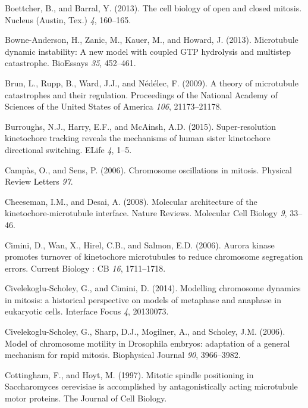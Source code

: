 \documentclass[12pt,a4paper,twoside,openright]{book}
\begin{document}
Boettcher, B., and Barral, Y. (2013). The cell biology of open and
closed mitosis. Nucleus (Austin, Tex.) \emph{4}, 160--165.

Bowne-Anderson, H., Zanic, M., Kauer, M., and Howard, J. (2013).
Microtubule dynamic instability: A new model with coupled GTP hydrolysis
and multistep catastrophe. BioEssays \emph{35}, 452--461.

Brun, L., Rupp, B., Ward, J.J., and Nédélec, F. (2009). A theory of
microtubule catastrophes and their regulation. Proceedings of the
National Academy of Sciences of the United States of America \emph{106},
21173--21178.

Burroughs, N.J., Harry, E.F., and McAinsh, A.D. (2015). Super-resolution
kinetochore tracking reveals the mechanisms of human sister kinetochore
directional switching. ELife \emph{4}, 1--5.

Campàs, O., and Sens, P. (2006). Chromosome oscillations in mitosis.
Physical Review Letters \emph{97}.

Cheeseman, I.M., and Desai, A. (2008). Molecular architecture of the
kinetochore-microtubule interface. Nature Reviews. Molecular Cell
Biology \emph{9}, 33--46.

Cimini, D., Wan, X., Hirel, C.B., and Salmon, E.D. (2006). Aurora kinase
promotes turnover of kinetochore microtubules to reduce chromosome
segregation errors. Current Biology : CB \emph{16}, 1711--1718.

Civelekoglu-Scholey, G., and Cimini, D. (2014). Modelling chromosome
dynamics in mitosis: a historical perspective on models of metaphase and
anaphase in eukaryotic cells. Interface Focus \emph{4}, 20130073.

Civelekoglu-Scholey, G., Sharp, D.J., Mogilner, A., and Scholey, J.M.
(2006). Model of chromosome motility in Drosophila embryos: adaptation
of a general mechanism for rapid mitosis. Biophysical Journal \emph{90},
3966--3982.

Cottingham, F., and Hoyt, M. (1997). Mitotic spindle positioning in
Saccharomyces cerevisiae is accomplished by antagonistically acting
microtubule motor proteins. The Journal of Cell Biology.
\end{document}
